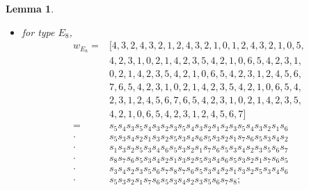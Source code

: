 \documentclass[reqno,12pt]{amsart}
\numberwithin{equation}{section}
\theoremstyle{plain}
\newtheorem{Lem}[Thm]{Lemma}
\theoremstyle{definition}
\begin{document}
\begin{Lem}
\begin{itemize}
        \item for type $E_8$, 
        \begin{align*}
w_{E_{8}}=&[4,3,2,4,3,2,1,2,4,3,2,1,0,1,2,4,3,2,1,0,5,\\
 &4,2,3,1,0,2,1,4,2,3,5,4,2,1,0,6, 5, 4, 2, 3, 1,\\
 & 0, 2, 1, 4, 2, 3, 5, 4, 2, 1, 0, 6, 5, 4, 2, 3, 1, 2, 4, 5, 6,\\
 &7, 6, 5, 4, 2, 3, 1, 0, 2, 1, 4, 2, 3, 5, 4, 2, 1, 0, 6, 5, 4,\\
 &2, 3, 1, 2, 4, 5, 6, 7, 6, 5, 4, 2, 3, 1, 0, 2, 1, 4, 2, 3, 5,\\
 &4, 2, 1, 0, 6, 5, 4, 2, 3, 1, 2, 4, 5, 6, 7] \\
=&s_5s_{4}s_{3}s_5s_{4}s_{3}s_2 s_{3}s_5s_{4}s_{3} s_2s_1s_2 s_{3}s_5s_{4}s_3 
s_2s_{1}s_6\\
 \cdot & s_5s_3s_4s_2s_1s_3s_2s_5s_3s_4s_6s_5s_3s_2s_1 s_7s_6s_5s_3s_4s_2\\
 \cdot & s_1s_3s_2s_5s_3s_4s_6s_5s_3s_2s_1s_7s_6s_5s_3s_4s_2s_3s_5s_6s_7\\
 \cdot &  
 s_8s_7s_6s_5s_3s_4s_2s_1s_3s_2s_5s_3s_4s_6s_5s_3s_2s_1s_7s_6s_5\\ \cdot & s_3s_4s_2s_3s_5s_6s_7s_8s_7s_6s_5s_3s_4s_2s_1s_3s_2s_5s_3s_4s_6\\ \cdot &s_5s_3s_2s_1s_7s_6s_5s_3s_4s_2s_3s_5s_6s_7s_8;
        \end{align*}
    \end{itemize}
\end{Lem}
\end{document}
